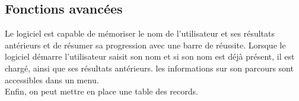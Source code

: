 \documentclass[a4paper,11pt]{report} %
\begin{document}
\subsection{Fonctions avancées}

Le logiciel est capable de mémoriser le nom de l'utilisateur et ses résultats antérieurs et de résumer sa progression avec une barre de réussite. Lorsque le logiciel démarre l'utilisateur saisit son nom et si son nom est déjà présent, il est chargé, ainsi que ses résultats antérieurs. les informations sur son parcours sont accessibles dans un menu. \\

Enfin, on peut mettre en place une table des records.
\end{document}
